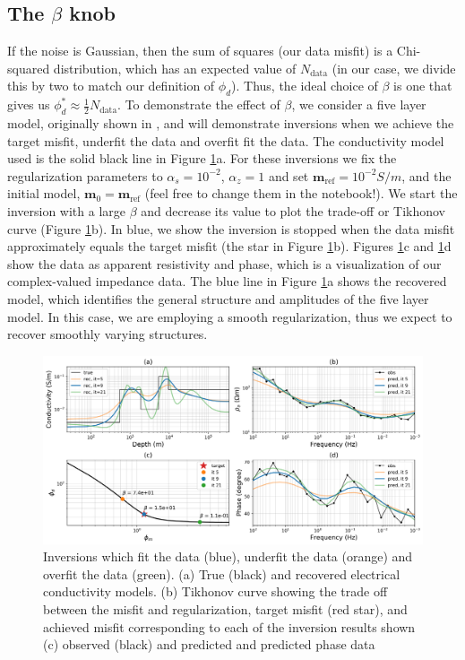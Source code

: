 \documentclass[11pt,oneside]{article}
\begin{document}
\subsection{The $\beta$ knob}
If the noise is Gaussian, then the sum of squares (our data misfit) is a Chi-squared distribution, which has an expected value of $N_\text{data}$ (in our case, we divide this by two to match our definition of $\phi_d$). Thus, the ideal choice of $\beta$ is one that gives us $\phi_d^* \approx \frac{1}{2} N_\text{data}$. To demonstrate the effect of $\beta$, we consider a five layer model, originally shown in \cite{Monographs}, and will demonstrate inversions when we achieve the target misfit, underfit the data and overfit fit the data. The conductivity model used is the solid black line in Figure \ref{fig:beta_knob}a. For these inversions we fix the regularization parameters to $\alpha_s = 10^{-2}$, $\alpha_z = 1$ and set $\mathbf{m}_{\text{ref}} = 10^{-2} S/m$, and the initial model, $\mathbf{m}_0 = \mathbf{m}_{\text{ref}}$ (feel free to change them in the notebook!). We start the inversion with a large $\beta$ and decrease its value to plot the trade-off or Tikhonov curve (Figure \ref{fig:beta_knob}b). In blue, we show the inversion is stopped when the data misfit approximately equals the  target misfit (the star in Figure \ref{fig:beta_knob}b). Figures \ref{fig:beta_knob}c and \ref{fig:beta_knob}d show the data as apparent resistivity and phase, which is a visualization of our complex-valued impedance data. The blue line in Figure \ref{fig:beta_knob}a shows the recovered model, which identifies the general structure and amplitudes of the five layer model. In this case, we are employing a smooth regularization, thus we expect to recover smoothly varying structures.

\begin{figure}[htb!]
    \centering
    \includegraphics[width=\textwidth]{images/beta_knob.png}
\caption{Inversions which fit the data (blue), underfit the data (orange) and overfit the data (green). (a) True (black) and recovered electrical conductivity models. (b) Tikhonov curve showing the trade off between the misfit and regularization, target misfit (red star), and achieved misfit corresponding to each of the inversion results shown (c) observed (black) and predicted and predicted phase data}
\label{fig:beta_knob}
\end{figure}
\end{document}
